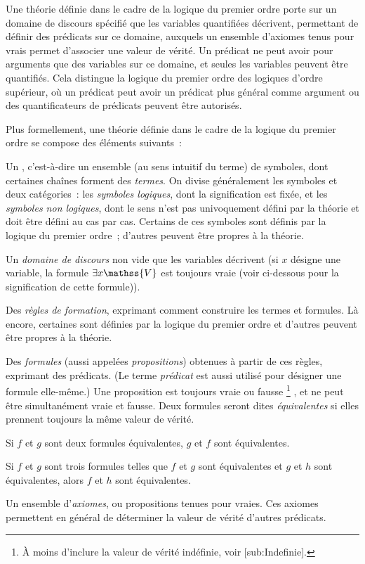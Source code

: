 Une théorie définie dans le cadre de la logique du premier ordre porte sur un domaine de discours spécifié que les variables quantifiées décrivent, permettant de définir des prédicats sur ce domaine, auxquels un ensemble d'axiomes tenus pour vrais permet d'associer une valeur de vérité. 
Un prédicat ne peut avoir pour arguments que des variables sur ce domaine, et seules les variables peuvent être quantifiés. 
Cela distingue la logique du premier ordre des logiques d'ordre supérieur, où un prédicat peut avoir un prédicat plus général comme argument ou des quantificateurs de prédicats peuvent être autorisés.

Plus formellement, une théorie définie dans le cadre de la logique du premier ordre se compose des éléments suivants : 
\startitemize[nowhite]
  \item Un \emph{}, c'est-à-dire un ensemble (au sens intuitif du terme) de symboles, dont certaines chaînes forment des \emph{termes}. 
    On divise généralement les symboles et deux catégories : les \emph{symboles logiques}, dont la signification est fixée, et les \emph{symboles non logiques}, dont le sens n'est pas univoquement défini par la théorie et doit être défini au cas par cas. 
    Certains de ces symboles sont définis par la logique du premier ordre ; d'autres peuvent être propres à la théorie. 
  \item Un \emph{domaine de discours} non vide que les variables décrivent (si $x$ désigne une variable, la formule $\exists x \mathss{V}$ est toujours vraie (voir ci-dessous pour la signification de cette formule)).
  \item Des \emph{règles de formation}, exprimant comment construire les termes et formules. 
    Là encore, certaines sont définies par la logique du premier ordre et d'autres peuvent être propres à la théorie.
  \item Des \emph{formules} (aussi appelées \emph{propositions}) obtenues à partir de ces règles, exprimant des prédicats. 
    (Le terme \emph{prédicat} est aussi utilisé pour désigner une formule elle-même.)
    Une proposition est toujours vraie ou fausse%
    \footnote{ À moins d'inclure la valeur de vérité indéfinie, voir [sub:Indefinie].}%
    , et ne peut être simultanément vraie et fausse. 
    Deux formules seront dites \emph{équivalentes} si elles prennent toujours la même valeur de vérité.
    \startitemize[nowhite]
      \item Si $f$ et $g$ sont deux formules équivalentes, $g$ et $f$ sont équivalentes.
      \item Si $f$ et $g$ sont trois formules telles que $f$ et $g$ sont équivalentes et $g$ et $h$ sont équivalentes, alors $f$ et $h$ sont équivalentes.
    \stopitemize
  \item Un ensemble d'\emph{axiomes}, ou propositions tenues pour vraies. 
        Ces axiomes permettent en général de déterminer la valeur de vérité d'autres prédicats.
\stopitemize


